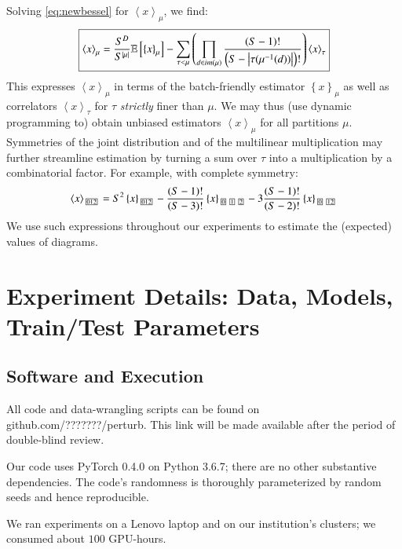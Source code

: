 \documentclass{article}
\theoremstyle{plain}
\theoremstyle{definition}
\newcommand{\wrap}[1]{\left(#1\right)}
\newcommand{\wang}[1]{\left\langle#1\right\rangle}
\newcommand{\wabs}[1]{\left|#1\right|}
\newcommand{\wurl}[1]{\left\{#1\right\}}
\newcommand{\partitionbox}[1]{
    \text{
        \fboxsep=0.5pt
        \tiny
        \fbox{#1}
    }
}
\newcommand{\expct}[1]{\mathbb{E}\left[#1\right]}
\begin{document}
    Solving \ref{eq:newbessel} for $\wang{x}_\mu$, we find:
    \begin{equation*}
        \text{\fbox{$
        \wang{x}_\mu
        =
        \frac{S^D}{S^{\wabs{\mu}}}
        \expct{
            \wurl{x}_\mu
        }
        -
        \sum_{\tau < \mu} \wrap{
            \prod_{d\in im(\mu)}
            \frac{\wrap{S-1}!}{\wrap{S-\wabs{\tau(\mu^{-1}(d))}}!}
        }
        \wang{x}_\tau
        $}}
    \end{equation*}
    This expresses $\wang{x}_\mu$ in terms of the batch-friendly estimator
    $\wurl{x}_\mu$ as well as correlators $\wang{x}_\tau$ for $\tau$ 
    \emph{strictly} finer than $\mu$.  We may thus (use dynamic programming to)
    obtain unbiased estimators $\wang{x}_\mu$ for all partitions $\mu$. 
    Symmetries of the joint distribution and of the multilinear multiplication
    may further streamline estimation by turning a sum over $\tau$ into a
    multiplication by a combinatorial factor.  For example, with complete
    symmetry:
    $$
        \wang{x}_{\partitionbox{012}}
        =
        S^2
        \wurl{x}_{\partitionbox{012}}
        -
        \frac{(S-1)!}{(S-3)!}
        \wurl{x}_{\partitionbox{0}\partitionbox{1}\partitionbox{2}}
        -
        3\frac{(S-1)!}{(S-2)!}
        \wurl{x}_{\partitionbox{0}\partitionbox{12}}
    $$
    We use such expressions throughout our experiments to estimate the
    (expected) values of diagrams.


\section{Experiment Details: Data, Models, Train/Test Parameters}\label{sect:landscape}
    \subsection{Software and Execution}
        All code and data-wrangling scripts can be found on
        {\color{mooteal}github.com/???????/perturb}.  This link will be made
        available after the period of double-blind review.

        Our code uses PyTorch 0.4.0 \cite{pa19} on Python 3.6.7; there are no
        other substantive dependencies.  The code's randomness is thoroughly
        parameterized by random seeds and hence reproducible.

        We ran experiments on a Lenovo laptop and on our institution's
        clusters; we consumed about $100$ GPU-hours.
\end{document}
